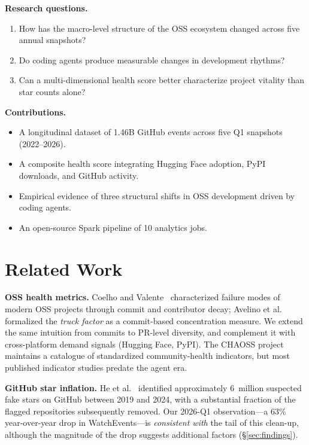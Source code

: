 \documentclass[11pt,twocolumn]{article}
\begin{document}
\textbf{Research questions.}
\begin{enumerate}[nosep]
  \item How has the macro-level structure of the OSS ecosystem changed across five annual snapshots?
  \item Do coding agents produce measurable changes in development rhythms?
  \item Can a multi-dimensional health score better characterize project vitality than star counts alone?
\end{enumerate}

\textbf{Contributions.}
\begin{itemize}[nosep]
  \item A longitudinal dataset of 1.46B GitHub events across five Q1 snapshots (2022--2026).
  \item A composite health score integrating Hugging Face adoption, PyPI downloads, and GitHub activity.
  \item Empirical evidence of three structural shifts in OSS development driven by coding agents.
  \item An open-source Spark pipeline of 10 analytics jobs.
\end{itemize}

\section{Related Work}\label{sec:related}

\textbf{OSS health metrics.}
Coelho and Valente~\cite{coelho2017} characterized failure modes of modern OSS projects through commit and contributor decay; Avelino et al.~\cite{avelino2016} formalized the \emph{truck factor} as a commit-based concentration measure.
We extend the same intuition from commits to PR-level diversity, and complement it with cross-platform demand signals (Hugging Face, PyPI).
The CHAOSS project~\cite{chaoss} maintains a catalogue of standardized community-health indicators, but most published indicator studies predate the agent era.

\textbf{GitHub star inflation.}
He et al.~\cite{he2024fakestars} identified approximately 6~million suspected fake stars on GitHub between 2019 and 2024, with a substantial fraction of the flagged repositories subsequently removed.
Our 2026-Q1 observation---a 63\% year-over-year drop in WatchEvents---is \emph{consistent with} the tail of this clean-up, although the magnitude of the drop suggests additional factors (\S\ref{sec:findings}).
\end{document}
